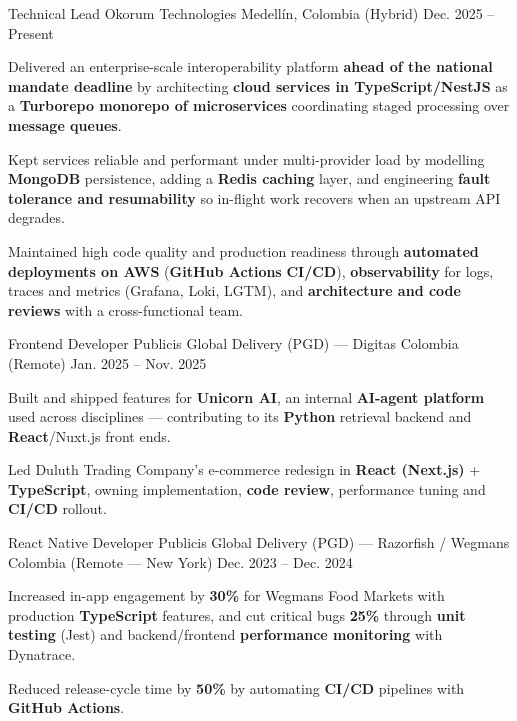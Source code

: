 \newcommand{\quotes}[1]{``#1''}

\begin{cventries}

  \cventry
  {Technical Lead}
  {Okorum Technologies}
  {Medellín, Colombia (Hybrid)}
  {Dec. 2025 -- Present}
  {
    \begin{cvitems}
      \item {Delivered an enterprise-scale interoperability platform \textbf{ahead of the national mandate deadline} by architecting \textbf{cloud services in TypeScript/NestJS} as a \textbf{Turborepo monorepo of microservices} coordinating staged processing over \textbf{message queues}.}
      \item {Kept services reliable and performant under multi-provider load by modelling \textbf{MongoDB} persistence, adding a \textbf{Redis caching} layer, and engineering \textbf{fault tolerance and resumability} so in-flight work recovers when an upstream API degrades.}
      \item {Maintained high code quality and production readiness through \textbf{automated deployments on AWS} (\textbf{GitHub Actions} \textbf{CI/CD}), \textbf{observability} for logs, traces and metrics (Grafana, Loki, LGTM), and \textbf{architecture and code reviews} with a cross-functional team.}
    \end{cvitems}
  }

  \cventry
  {Frontend Developer}
  {Publicis Global Delivery (PGD) — Digitas}
  {Colombia (Remote)}
  {Jan. 2025 -- Nov. 2025}
  {
    \begin{cvitems}
      \item {Built and shipped features for \textbf{Unicorn AI}, an internal \textbf{AI-agent platform} used across disciplines --- contributing to its \textbf{Python} retrieval backend and \textbf{React}/Nuxt.js front ends.}
      \item {Led Duluth Trading Company's e-commerce redesign in \textbf{React (Next.js)} + \textbf{TypeScript}, owning implementation, \textbf{code review}, performance tuning and \textbf{CI/CD} rollout.}
    \end{cvitems}
  }

  \cventry
  {React Native Developer}
  {Publicis Global Delivery (PGD) — Razorfish / Wegmans}
  {Colombia (Remote — New York)}
  {Dec. 2023 -- Dec. 2024}
  {
    \begin{cvitems}
      \item {Increased in-app engagement by \textbf{30\%} for Wegmans Food Markets with production \textbf{TypeScript} features, and cut critical bugs \textbf{25\%} through \textbf{unit testing} (Jest) and backend/frontend \textbf{performance monitoring} with Dynatrace.}
      \item {Reduced release-cycle time by \textbf{50\%} by automating \textbf{CI/CD} pipelines with \textbf{GitHub Actions}.}
    \end{cvitems}
  }


\end{cventries}
